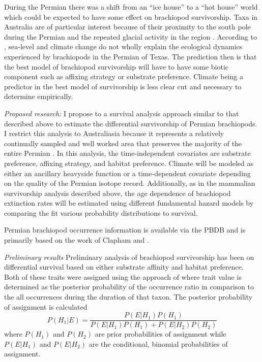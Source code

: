 \documentclass[12pt,letterpaper]{article}
\begin{document}
During the Permian there was a shift from an ``ice house'' to a ``hot house'' world \citep{Fielding2006,Birgenheier2010,Jones2006,Powell2007} which could be expected to have some effect on brachiopod survivorship. Taxa in Australia are of particular interest because of their proximity to the south pole during the Permian and the repeated glacial activity in the region \citep{Fielding2006,Birgenheier2010,Jones2006}. According to \citet{Olszewski2004}, sea-level and climate change do not wholly explain the ecological dynamics experienced by brachiopods in the Permian of Texas. The prediction then is that the best model of brachiopod survivorship will have to have some biotic component such as affixing strategy or substrate preference. Climate being a predictor in the best model of survivorship is less clear cut and necessary to determine empirically.


\textit{Proposed research:}
I propose to a survival analysis approach similar to that described above to estimate the differential survivorship of Permian brachiopods. I restrict this analysis to Australiasia because it represents a relatively continually sampled and well worked area that preserves the majority of the entire Permian \citep{Clapham2012,Clapham2008a,Waterhouse1987,Archbold1995}. In this analysis, the time-independent covariates are substrate preference, affixing strategy, and habitat preference. Climate will be modeled as either an ancillary heavyside function or a time-dependent covariate depending on the quality of the Permian isotope record. Additionally, as in the mammalian survivorship analysis described above, the age dependence of brachiopod extinction rates will be estimated using different fundamental hazard models by comparing the fit various probability distributions to survival.

Permian brachiopod occurrence information is available via the PBDB and is primarily based on the work of Clapham \citep{Clapham2006,Clapham2008a,Clapham2007a,Clapham2012,Clapham2007} and \citet{Waterhouse1987}.


\textit{Preliminary results}
Preliminary analysis of brachiopod survivorship has been on differential survival based on either substrate affinity and habitat preference. Both of these traits were assigned using the approach of \citet{Simpson2009} where trait value is determined as the posterior probability of the occurrence ratio in comparison to the all occurrences during the duration of that taxon. The posterior probability of assignment is calculated
\begin{equation}
  P(H_{1}|E) = \frac{P(E|H_{1})P(H_{1})}{P(E|H_{1})P(H_{1}) + P(E|H_{2})P(H_{2})}
\end{equation}
where \(P(H_{1})\) and \(P(H_{2})\) are prior probabilities of assignment while \(P(E|H_{1})\) and \(P(E|H_{2})\) are the conditional, binomial probabilities of assignment. 
\end{document}
